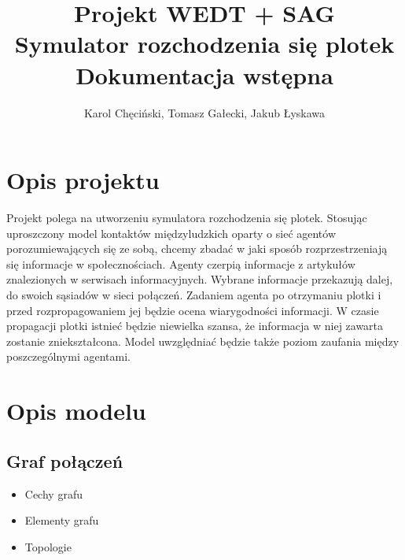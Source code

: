\documentclass{article}
\title{Projekt WEDT + SAG \\ Symulator rozchodzenia się plotek \\ Dokumentacja wstępna}
\author{Karol Chęciński, Tomasz Gałecki, Jakub Łyskawa}
\begin{document}
	\maketitle
	\section{Opis projektu}
		Projekt polega na utworzeniu symulatora rozchodzenia się plotek. Stosując uproszczony model kontaktów międzyludzkich oparty o sieć agentów porozumiewających się ze sobą, chcemy zbadać w jaki sposób rozprzestrzeniają się informacje w społecznościach. Agenty czerpią informacje z artykułów znalezionych w serwisach informacyjnych. Wybrane informacje przekazują dalej, do swoich sąsiadów w sieci połączeń. Zadaniem agenta po otrzymaniu plotki i przed rozpropagowaniem jej będzie ocena wiarygodności informacji. W czasie propagacji plotki istnieć będzie niewielka szansa, że informacja w niej zawarta zostanie zniekształcona. Model uwzględniać będzie także poziom zaufania między poszczególnymi agentami.
	\section{Opis modelu}
	\subsection{Graf połączeń}
	\begin{itemize}
		\item{Cechy grafu}
		\item{Elementy grafu}
		\item{Topologie}
	\end{itemize}
\end{document}
